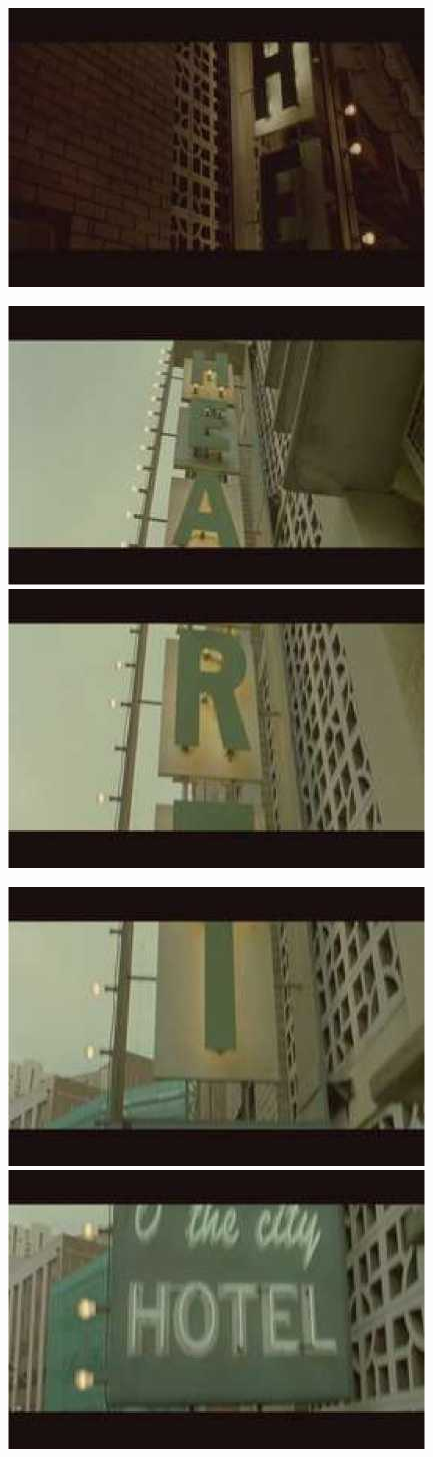 \documentclass{ctexart}
\begin{document}
\begin{figure}[htb]
\centering
\includegraphics[width=0.5\linewidth]{fig/read_Matrix-81}
\end{figure}

\begin{figure}[htb]
\centering
\includegraphics[width=0.45\linewidth]{fig/read_Matrix-82}
\includegraphics[width=0.45\linewidth]{fig/read_Matrix-83}

\vspace{3pt}

\includegraphics[width=0.45\linewidth]{fig/read_Matrix-84}
\includegraphics[width=0.45\linewidth]{fig/read_Matrix-85}
\end{figure}
\end{document}
